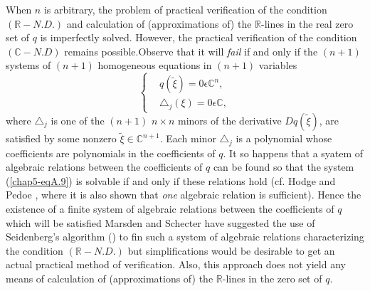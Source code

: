 When $n$ is arbitrary, the problem of practical verification of the condition $(\mathbb{R}-N.D.)$ and calculation of (approximations of) the $\mathbb{R}$-lines in the real zero set of $q$ is imperfectly solved. However, the practical verification of the condition $(\mathbb{C}-N.D)$ remains possible.\pageoriginale Observe that it will {\em fail} if and only if the $(n+1)$ systems of $(n + 1)$ homogeneous equations in $(n + 1)$ variables
\begin{equation*}
\begin{cases}
& q(\widetilde{\xi}) = 0 \epsilon \mathbb{C}^{n},\\
& \triangle_{j}(\xi) = 0 \epsilon \mathbb{C},
\end{cases}\tag{A.9}\label{chap5-eqA.9}
\end{equation*}
where $\triangle_{j}$ is one of the $(n + 1)$ $n \times n$ minors of the derivative $Dq(\widetilde{\xi})$, are satisfied by some nonzero $\widetilde{\xi} \in \mathbb{C}^{n+1}$. Each minor $\triangle_{j}$ is a polynomial whose coefficients are polynomials in the coefficients of $q$. It so happens that a syatem of algebraic relations between the coefficients of $q$ can be found so that the system (\ref{chap5-eqA.9}) is solvable if and only if these relations hold (cf. Hodge and Pedoe \cite{16}, where it is also shown that {\em one} algebraic relation is sufficient). Hence the existence of a finite system of algebraic relations between the coefficients of $q$ which will be satisfied Marsden and Schecter have suggested the use of Seidenberg's algorithm (\cite{36}) to fin such a system of algebraic relations characterizing the condition $(\mathbb{R}-N.D.)$ but simplifications would be desirable to get an actual practical method of verification. Also, this approach does not yield any means of calculation of (approximations of) the $\mathbb{R}$-lines in the zero set of $q$.


